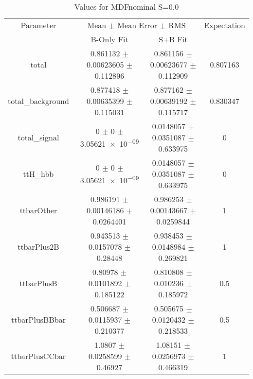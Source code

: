\begin{table}
\centering
\caption{Values for MDFnominal S=0.0}
\begin{tabular}{cccc}
\toprule
Parameter & \multicolumn{2}{c}{Mean $\pm$ Mean Error $\pm$ RMS} & Expectation\\
 & B-Only Fit & S+B Fit & \\
\midrule
total & \num{0.861132} $\pm$ \num{0.00623605} $\pm$ \num{0.112896} & \num{0.861156} $\pm$ \num{0.00623677} $\pm$ \num{0.112909} & \num{0.807163}\\
total\_background & \num{0.877418} $\pm$ \num{0.00635399} $\pm$ \num{0.115031} & \num{0.877162} $\pm$ \num{0.00639192} $\pm$ \num{0.115717} & \num{0.830347}\\
total\_signal & \num{0} $\pm$ \num{0} $\pm$ \num{3.05621e-09} & \num{0.0148057} $\pm$ \num{0.0351087} $\pm$ \num{0.633975} & \num{0}\\
ttH\_hbb & \num{0} $\pm$ \num{0} $\pm$ \num{3.05621e-09} & \num{0.0148057} $\pm$ \num{0.0351087} $\pm$ \num{0.633975} & \num{0}\\
ttbarOther & \num{0.986191} $\pm$ \num{0.00146186} $\pm$ \num{0.0264401} & \num{0.986253} $\pm$ \num{0.00143667} $\pm$ \num{0.0259844} & \num{1}\\
ttbarPlus2B & \num{0.943513} $\pm$ \num{0.0157078} $\pm$ \num{0.28448} & \num{0.938453} $\pm$ \num{0.0148984} $\pm$ \num{0.269821} & \num{1}\\
ttbarPlusB & \num{0.80978} $\pm$ \num{0.0101892} $\pm$ \num{0.185122} & \num{0.810808} $\pm$ \num{0.010236} $\pm$ \num{0.185972} & \num{0.5}\\
ttbarPlusBBbar & \num{0.506687} $\pm$ \num{0.0115937} $\pm$ \num{0.210377} & \num{0.505675} $\pm$ \num{0.0120432} $\pm$ \num{0.218533} & \num{0.5}\\
ttbarPlusCCbar & \num{1.0807} $\pm$ \num{0.0258599} $\pm$ \num{0.46927} & \num{1.08151} $\pm$ \num{0.0256973} $\pm$ \num{0.466319} & \num{1}\\
\bottomrule
\end{tabular}
\end{table}